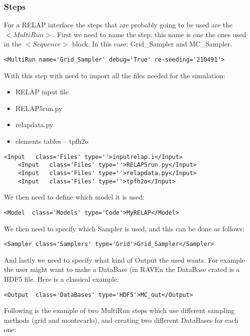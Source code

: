 \subsubsection{Steps}
For a RELAP interface the steps that are probably going to be used are the $<MultiRun>$. 
First we need to name the step: this name is one the ones used in the $<Sequence>$ block. In this case: Grid\_Sampler and MC\_Sampler.
\begin{lstlisting}[style=XML]
     <MultiRun name='Grid_Sampler' debug='True' re-seeding='210491'>
\end{lstlisting}
With this step with need to import all the files needed for the simulation:
\begin{itemize}
\item RELAP input file
\item RELAP5run.py
\item relapdata.py
\item elements tables -- tpfh2o 
\end{itemize}
\begin{lstlisting}[style=XML]
    <Input   class='Files' type=''>inputrelap.i</Input>
    <Input   class='Files' type=''>RELAP5run.py</Input>
    <Input   class='Files' type=''>relapdata.py</Input>
    <Input   class='Files' type=''>tpfh2o</Input>
\end{lstlisting}
We then need to define which model it is used:
\begin{lstlisting}[style=XML]
    <Model  class='Models' type='Code'>MyRELAP</Model>
\end{lstlisting}
We then need to specify which Sampler is used, and this can be done as follows:
\begin{lstlisting}[style=XML]
    <Sampler class='Samplers' type='Grid'>Grid_Sampler</Sampler>
\end{lstlisting}
And lastly we need to specify what kind of Output the used wants. For example the user might want to make a DataBase (in RAVEn the DataBase crated is a HDF5 file. Here is a classical example:
\begin{lstlisting}[style=XML]
    <Output  class='DataBases' type='HDF5'>MC_out</Output>
\end{lstlisting}
Following is the example of two MultiRun steps which use different sampling methods (grid and montecarlo), and creating two different DataBases for each one:
